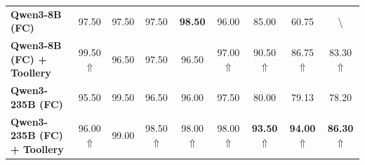 \begin{table}[htb]
{\begin{tabular}{lcccccccc}
\textbf{Qwen3-8B (FC)}                      & 97.50  & 97.50  & 97.50 & \textbf{98.50} & 96.00 & 85.00 & 60.75 & \textbackslash{} \\
\textbf{Qwen3-8B (FC) + Toollery}           & 99.50 $\Uparrow$  & 96.50  & 97.50 & 96.50 & 97.00 $\Uparrow$ & 90.50 $\Uparrow$ & 86.75 $\Uparrow$ & 83.30 $\Uparrow$            \\ \hline
\textbf{Qwen3-235B (FC)}                    & 95.50  & 99.50  & 96.50 & 96.00 & 97.50 & 80.00 & 79.13 & 78.20            \\
\textbf{Qwen3-235B (FC) + Toollery}         & 96.00 $\Uparrow$  & 99.00  & 98.50 $\Uparrow$ & 98.00 $\Uparrow$ & 98.00 $\Uparrow$ & \textbf{93.50} $\Uparrow$ & \textbf{94.00} $\Uparrow$ & \textbf{86.30} $\Uparrow$            \\ \hline \hline
\end{tabular}
}
\vskip -0.1in
\end{table}
